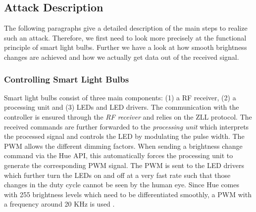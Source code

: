 
\subsection{Attack Description} %
\label{sec:exp:description}


The following paragraphs give a detailed description of the main steps to realize such an attack. Therefore, we first need to look more precisely at the functional principle of smart light bulbs. Further we have a look at how smooth brightness changes are achieved and how we actually get data out of the received signal.\newline



\subsubsection{Controlling Smart Light Bulbs} 
Smart light bulbs consist of three main components: (1) a RF receiver, (2) a processing unit and (3) LEDs and LED drivers.
The communication with the controller is ensured through the \textit{RF receiver} and relies on the ZLL protocol. The received commands are further forwarded to the \textit{processing unit} which interprets the processed signal and controls the LED by modulating the pulse width. The PWM allows the different dimming factors. When sending a brightness change command via the Hue API, this automatically forces the processing unit to generate the corresponding PWM signal. The PWM is sent to the LED drivers which further turn the LEDs on and off at a very fast rate such that those changes in the duty cycle cannot be seen by the human eye. Since Hue comes with 255 brightness levels which need to be differentiated smoothly, a PWM with a frequency around 20 KHz is used \cite{Ronen:2016:EFAIDCSL}. 

